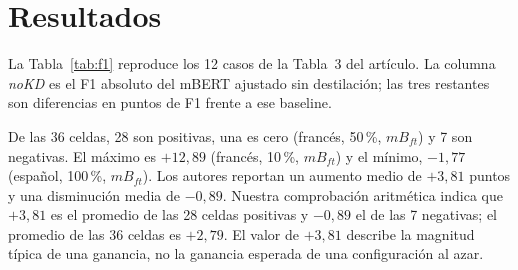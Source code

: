 \section{Resultados}
\label{sec:resultados}

La Tabla~\ref{tab:f1} reproduce los 12 casos de la Tabla~3 del artículo. La columna \textit{noKD} es el F1 absoluto del mBERT ajustado sin destilación; las tres restantes son diferencias en puntos de F1 frente a ese baseline.



De las 36 celdas, 28 son positivas, una es cero (francés, 50\,\%, $mB_{ft}$) y 7 son negativas. El máximo es $+12{,}89$ (francés, 10\,\%, $mB_{ft}$) y el mínimo, $-1{,}77$ (español, 100\,\%, $mB_{ft}$). Los autores reportan un aumento medio de $+3{,}81$ puntos y una disminución media de $-0{,}89$. Nuestra comprobación aritmética indica que $+3{,}81$ es el promedio de las 28 celdas positivas y $-0{,}89$ el de las 7 negativas; el promedio de las 36 celdas es $+2{,}79$. El valor de $+3{,}81$ describe la magnitud típica de una ganancia, no la ganancia esperada de una configuración al azar.

